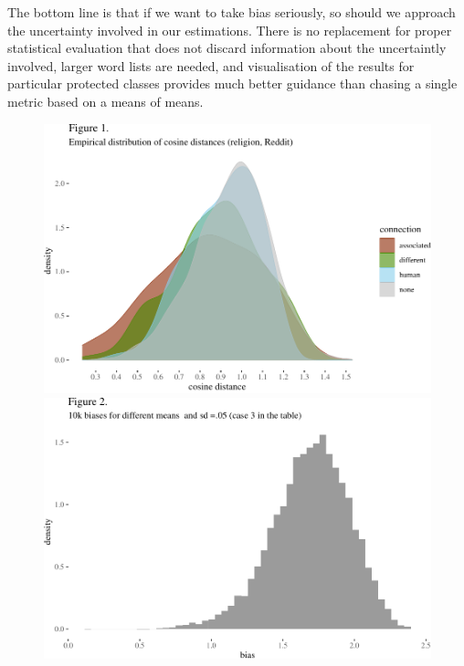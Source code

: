 \documentclass[12pt,dvipsnames,enabledeprecatedfontcommands]{scrartcl}
\begin{document}
The bottom line is that if we want to take bias seriously, so should we
approach the uncertainty involved in our estimations. There is no
replacement for proper statistical evaluation that does not discard
information about the uncertaintly involved, larger word lists are
needed, and visualisation of the results for particular protected
classes provides much better guidance than chasing a single metric based
on a means of means.

\pagebreak

\begin{center}
\begin{figure}[!htb]\centering
   \begin{minipage}{0.48\textwidth}

\begin{center}\includegraphics[width=1\linewidth]{abstractESSLLI1_files/figure-latex/unnamed-chunk-1-1} \end{center}
   \end{minipage}
   \begin {minipage}{0.48\textwidth}

\begin{center}\includegraphics[width=1\linewidth]{abstractESSLLI1_files/figure-latex/unnamed-chunk-2-1} \end{center}
   \end{minipage}
   

\end{figure}
\end{center}
\end{document}
